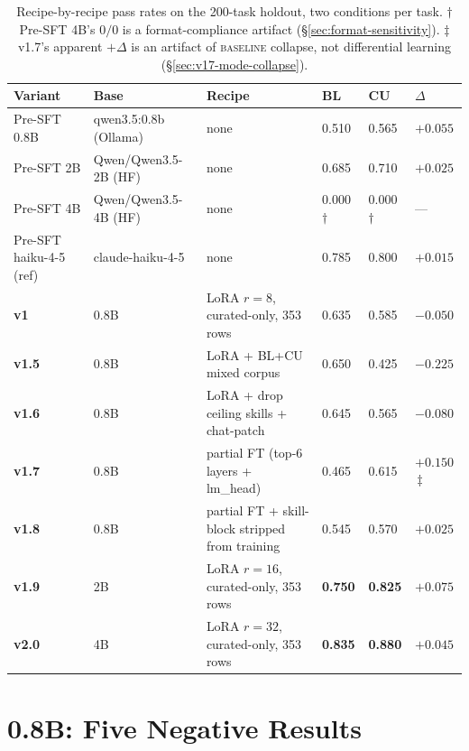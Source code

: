 \documentclass[10pt]{article}
\newcommand{\BL}{\textsc{baseline}\xspace}
\begin{document}
\begin{table}[h]
\centering
\small
\begin{tabular}{@{}llllll@{}}
\toprule
\textbf{Variant} & \textbf{Base} & \textbf{Recipe} & \textbf{BL} & \textbf{CU} & \textbf{$\Delta$} \\
\midrule
Pre-SFT 0.8B & qwen3.5:0.8b (Ollama) & none & 0.510 & 0.565 & $+0.055$ \\
Pre-SFT 2B   & Qwen/Qwen3.5-2B (HF)  & none & 0.685 & 0.710 & $+0.025$ \\
Pre-SFT 4B   & Qwen/Qwen3.5-4B (HF)  & none & $0.000$\,$\dagger$ & $0.000$\,$\dagger$ & --- \\
Pre-SFT haiku-4-5 (ref) & claude-haiku-4-5 & none & 0.785 & 0.800 & $+0.015$ \\
\addlinespace
\textbf{v1}    & 0.8B & LoRA $r{=}8$, curated-only, 353 rows           & 0.635 & 0.585 & $-0.050$ \\
\textbf{v1.5}  & 0.8B & LoRA + BL+CU mixed corpus                       & 0.650 & 0.425 & $-0.225$ \\
\textbf{v1.6}  & 0.8B & LoRA + drop ceiling skills + chat-patch         & 0.645 & 0.565 & $-0.080$ \\
\textbf{v1.7}  & 0.8B & partial FT (top-6 layers + lm\_head)            & 0.465 & 0.615 & $+0.150$\,$\ddagger$ \\
\textbf{v1.8}  & 0.8B & partial FT + skill-block stripped from training & 0.545 & 0.570 & $+0.025$ \\
\textbf{v1.9}  & 2B   & LoRA $r{=}16$, curated-only, 353 rows           & \textbf{0.750} & \textbf{0.825} & $\boldsymbol{+0.075}$ \\
\textbf{v2.0}  & 4B   & LoRA $r{=}32$, curated-only, 353 rows           & \textbf{0.835} & \textbf{0.880} & $\boldsymbol{+0.045}$ \\
\bottomrule
\end{tabular}
\caption{Recipe-by-recipe pass rates on the 200-task holdout, two conditions per task. $\dagger$ Pre-SFT 4B's $0/0$ is a format-compliance artifact (\S\ref{sec:format-sensitivity}). $\ddagger$ v1.7's apparent $+\Delta$ is an artifact of \BL{} collapse, not differential learning (\S\ref{sec:v17-mode-collapse}).}
\label{tab:headline}
\end{table}

\section{0.8B: Five Negative Results}
\end{document}
